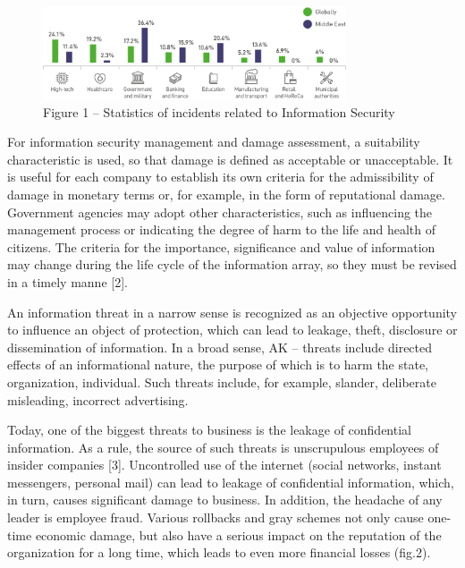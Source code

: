 \begin{figure}[H]
	\centering
	\includegraphics[width=0.8\textwidth]{assets/63}
	\caption*{Figure 1 -- Statistics of incidents related to Information Security}
\end{figure}

\begin{multicols}{2}
For information security management and damage assessment, a suitability
characteristic is used, so that damage is defined as acceptable or
unacceptable. It is useful for each company to establish its own
criteria for the admissibility of damage in monetary terms or, for
example, in the form of reputational damage. Government agencies may
adopt other characteristics, such as influencing the management process
or indicating the degree of harm to the life and health of citizens. The
criteria for the importance, significance and value of information may
change during the life cycle of the information array, so they must be
revised in a timely manne {[}2{]}.

An information threat in a narrow sense is recognized as an objective
opportunity to influence an object of protection, which can lead to
leakage, theft, disclosure or dissemination of information. In a broad
sense, AK -- threats include directed effects of an informational
nature, the purpose of which is to harm the state, organization,
individual. Such threats include, for example, slander, deliberate
misleading, incorrect advertising.

Today, one of the biggest threats to business is the leakage of
confidential information. As a rule, the source of such threats is
unscrupulous employees of insider companies {[}3{]}. Uncontrolled use of
the internet (social networks, instant messengers, personal mail) can
lead to leakage of confidential information, which, in turn, causes
significant damage to business. In addition, the headache of any leader
is employee fraud. Various rollbacks and gray schemes not only cause
one-time economic damage, but also have a serious impact on the
reputation of the organization for a long time, which leads to even more
financial losses (fig.2).
\end{multicols}

